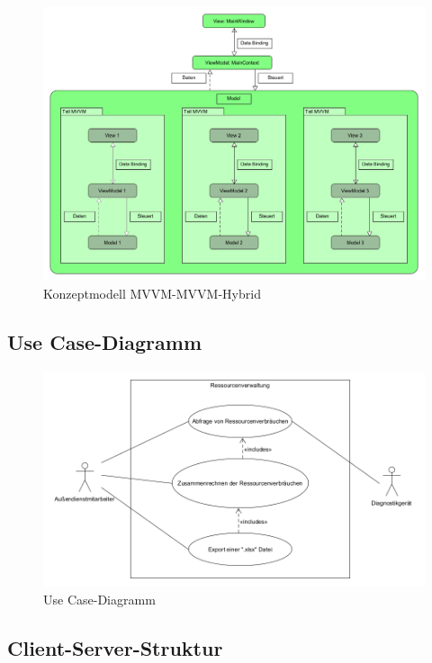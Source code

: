 \begin{figure}[htb]
	\centering
	\includegraphics[scale=0.4]{Bilder/HybridMVVM.png}
	\caption{Konzeptmodell MVVM-MVVM-Hybrid}
	\label{fig:Hybrid}
\end{figure} 

\cleardoublepage

\subsection{Use Case-Diagramm}
\label{app:UseCaseDiagramm}

\begin{figure}[htb]
	\centering
	\includegraphics[scale=0.5]{Bilder/UseCaseDiagramm.png}
	\caption{Use Case-Diagramm}
	\label{fig:UseCase}
\end{figure} 

\cleardoublepage

\subsection{Client-Server-Struktur}
\label{app:ClientServerStruktur}


